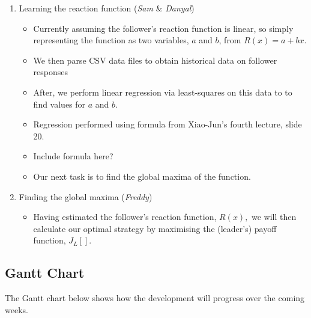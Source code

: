 \documentclass[10pt,a4paper]{report}
\begin{document}
\begin{enumerate}
  \item Learning the reaction function (\emph{Sam} \& \emph{Danyal})
    \begin{itemize}
      \item Currently assuming the follower's reaction function is linear, so simply representing the function as two variables, $a$ and $b$, from $R(x) = a + bx$.
      \item We then parse CSV data files to obtain historical data on follower responses
      \item After, we perform linear regression via least-squares on this data to to find values for $a$ and $b$.
      \item Regression performed using formula from Xiao-Jun's fourth lecture, slide 20.
      \item Include formula here?
      \item Our next task is to find the global maxima of the function.
    \end{itemize}
  \item Finding the global maxima (\emph{Freddy})
    \begin{itemize}
      \item Having estimated the follower's reaction function, $R(x),$ we will then calculate our optimal strategy by maximising the (leader's) payoff function, $J_L[]$.
    \end{itemize}
\end{enumerate}

\subsection{Gantt Chart}
The Gantt chart below shows how the development will progress over the coming weeks.
\end{document}
